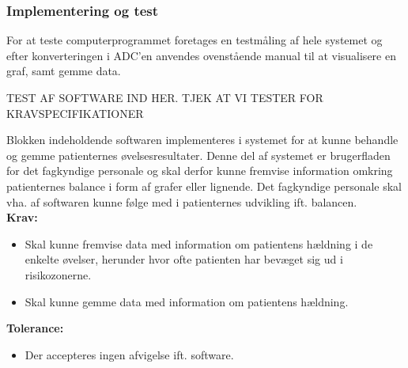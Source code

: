 \subsubsection{Implementering og test}
For at teste computerprogrammet foretages en testmåling af hele systemet og efter konverteringen i ADC'en anvendes ovenstående manual til at visualisere en graf, samt gemme data. 

TEST AF SOFTWARE IND HER. TJEK AT VI TESTER FOR KRAVSPECIFIKATIONER


Blokken indeholdende softwaren implementeres i systemet for at kunne behandle og gemme patienternes øvelsesresultater. Denne del af systemet er brugerfladen for det fagkyndige personale og skal derfor kunne fremvise information omkring patienternes balance i form af grafer eller lignende. Det fagkyndige personale skal vha. af softwaren kunne følge med i patienternes udvikling ift. balancen. \\
\textbf{Krav:}
\begin{itemize}
	\item Skal kunne fremvise data med information om patientens hældning i de enkelte øvelser, herunder hvor ofte patienten har bevæget sig ud i risikozonerne. 
	\item Skal kunne gemme data med information om patientens hældning.
\end{itemize}
\textbf{Tolerance:}
\begin{itemize}
	\item Der accepteres ingen afvigelse ift. software. 
\end{itemize}



